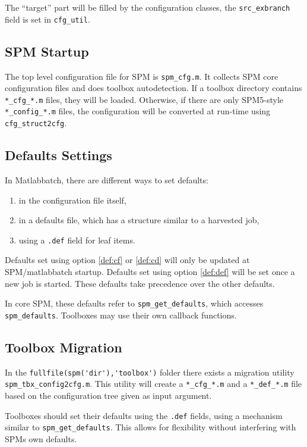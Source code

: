 The ``target'' part will be filled by the configuration classes, the
\verb|src_exbranch| field is set in \verb|cfg_util|.

\subsection{SPM Startup}

The top level configuration file for SPM is \verb|spm_cfg.m|. It collects SPM
core configuration files and does toolbox autodetection. If a toolbox
directory contains \verb|*_cfg_*.m| files, they will be loaded. Otherwise, if
there are only SPM5-style \verb|*_config_*.m| files, the configuration will be
converted at run-time using \verb|cfg_struct2cfg|.

\subsection{Defaults Settings}

In Matlabbatch, there are different ways to set defaults:
\begin{enumerate}
\item \label{def:cf}in the configuration file itself,
\item \label{def:cd}in a defaults file, which has a structure similar to a harvested
  job,
\item \label{def:def}using a \verb|.def| field for leaf items.
\end{enumerate}
Defaults set using option \ref{def:cf} or \ref{def:cd} will only be
updated at SPM/matlabbatch startup. Defaults set using option
\ref{def:def} will be set once a new job is started. These defaults take
precedence over the other defaults.

In core SPM, these defaults refer to \verb|spm_get_defaults|, which accesses
\verb|spm_defaults|. Toolboxes may use their own callback functions.

\subsection{Toolbox Migration}

In the \verb|fullfile(spm('dir'),'toolbox')| folder there exists a migration
utility \verb|spm_tbx_config2cfg.m|. This utility will create a
\verb|*_cfg_*.m| and a \verb|*_def_*.m| file based on the configuration tree
given as input argument.

Toolboxes should set their defaults using the \verb|.def| fields,
using a mechanism similar to \verb|spm_get_defaults|. This allows for
flexibility without interfering with SPMs own defaults.


